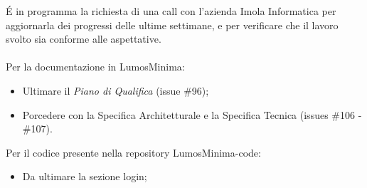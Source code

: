 \documentclass[a4paper, 12pt]{article}
\begin{document}
\'E in programma la richiesta di una call con l'azienda Imola Informatica per aggiornarla dei progressi delle ultime settimane, e per verificare che il lavoro svolto sia conforme alle aspettative.\\ \\
Per la documentazione in LumosMinima:
\begin{itemize}
    \item Ultimare il \textit{Piano di Qualifica} (issue \#96);
    \item Porcedere con la Specifica Architetturale e la Specifica Tecnica (issues \#106 - \#107).
\end{itemize}
\vspace*{0.5cm}
Per il codice presente nella repository LumosMinima-code:
\begin{itemize}
    \item Da ultimare la sezione login;
\end{itemize}
\end{document}
